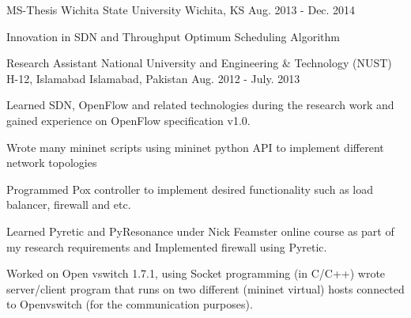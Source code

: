 

\begin{cventries}

  \cventry
    {MS-Thesis} %
    {Wichita State University} %
    {Wichita, KS} %
    {Aug. 2013 - Dec. 2014} %
    {
      \begin{cvitems} %
        \item {Innovation in SDN and Throughput Optimum Scheduling Algorithm}
      \end{cvitems}
    }

  \cventry
    {Research Assistant} %
    {National University and Engineering \& Technology (NUST) H-12, Islamabad} %
    {Islamabad, Pakistan} %
    {Aug. 2012 - July. 2013} %
    {
      \begin{cvitems} %
        \item {Learned SDN, OpenFlow and related technologies during the research work and
                gained experience on OpenFlow specification v1.0.}
        \item {Wrote many mininet scripts using mininet python API to implement different network topologies}
        \item {Programmed Pox controller to implement desired functionality such as load balancer, firewall
                and etc.}
        \item {Learned Pyretic and PyResonance under Nick Feamster online course as part of my research requirements
                and Implemented firewall using Pyretic.}
        \item {Worked on Open vswitch 1.7.1, using Socket programming (in C/C++) wrote server/client program that runs
                on two different (mininet virtual) hosts connected to Openvswitch (for the communication purposes).}
      \end{cvitems}
    }


\end{cventries}
